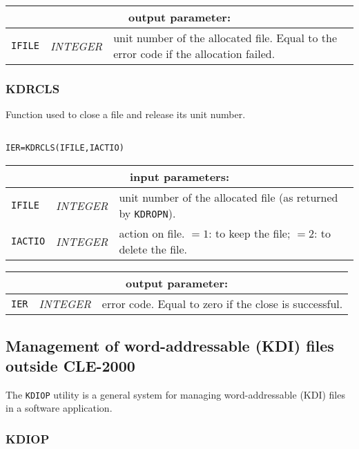 \vskip 0.4cm
\noindent
\begin{tabular}{|p{1.5cm}|p{3cm}|p{10cm}|}
\hline
\multicolumn{3}{|c|}{\bf output parameter:} \\
\hline
{\tt IFILE} & {\it INTEGER}  & unit number of the allocated file. Equal to the error code if the allocation failed.  \\
\hline
\end{tabular}

\subsubsection{KDRCLS}

Function used to close a file and release its unit number.

\begin{verbatim}

IER=KDRCLS(IFILE,IACTIO)
\end{verbatim}

\noindent
\begin{tabular}{|p{1.5cm}|p{3cm}|p{10cm}|}
\hline
\multicolumn{3}{|c|}{\bf input parameters:} \\
\hline
{\tt IFILE} & {\it INTEGER} &  unit number of the allocated file (as returned by {\tt KDROPN}). \\
\hline
{\tt IACTIO} & {\it INTEGER}  & action on file.
$=1$: to keep the file;
$=2$: to delete the file.  \\
\hline
\end{tabular}

\vskip 0.4cm
\noindent
\begin{tabular}{|p{1.5cm}|p{3cm}|p{10cm}|}
\hline
\multicolumn{3}{|c|}{\bf output parameter:} \\
\hline
{\tt IER} & {\it INTEGER}  & error code. Equal to zero if the close is successful.  \\
\hline
\end{tabular}

\clearpage

\subsection {Management of word-addressable (KDI) files outside CLE-2000}

The {\tt KDIOP} utility is a general system for managing word-addressable (KDI) files in a software application.

\subsubsection{KDIOP}

